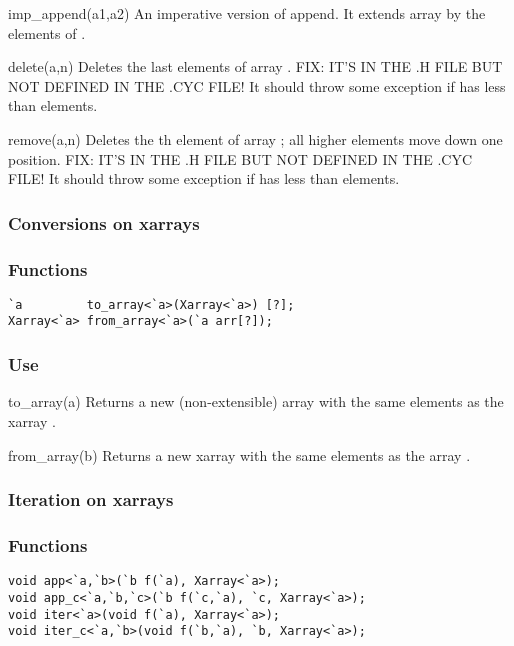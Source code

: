 \begin{defun}{imp_append}{(a1,a2)}
An imperative version of append.  It extends array  by the
elements of .
\end{defun}

\begin{defun}{delete}{(a,n)}
Deletes the last  elements of array .  FIX: IT'S IN THE .H
FILE BUT NOT DEFINED IN THE .CYC FILE!  It should throw some exception
if  has less than  elements.
\end{defun}


\begin{defun}{remove}{(a,n)}
Deletes the th element of array ; all higher elements move
down one position.  FIX: IT'S IN THE .H FILE BUT NOT DEFINED IN THE .CYC
FILE!  It should throw some exception if  has less than 
elements.
\end{defun}

\subsubsection*{Conversions on xarrays}
\subsubsection*{Functions}
\begin{verbatim}
`a         to_array<`a>(Xarray<`a>) [?];
Xarray<`a> from_array<`a>(`a arr[?]);
\end{verbatim}

\subsubsection*{Use}

\begin{defun}{to_array}{(a)}
Returns a new (non-extensible) array with the same elements as the
xarray .
\end{defun}

\begin{defun}{from_array}{(b)}
Returns a new xarray with the same elements as the array .
\end{defun}

\subsubsection*{Iteration on xarrays}
\subsubsection*{Functions}
\begin{verbatim}
void app<`a,`b>(`b f(`a), Xarray<`a>);
void app_c<`a,`b,`c>(`b f(`c,`a), `c, Xarray<`a>);
void iter<`a>(void f(`a), Xarray<`a>);
void iter_c<`a,`b>(void f(`b,`a), `b, Xarray<`a>);
\end{verbatim}

